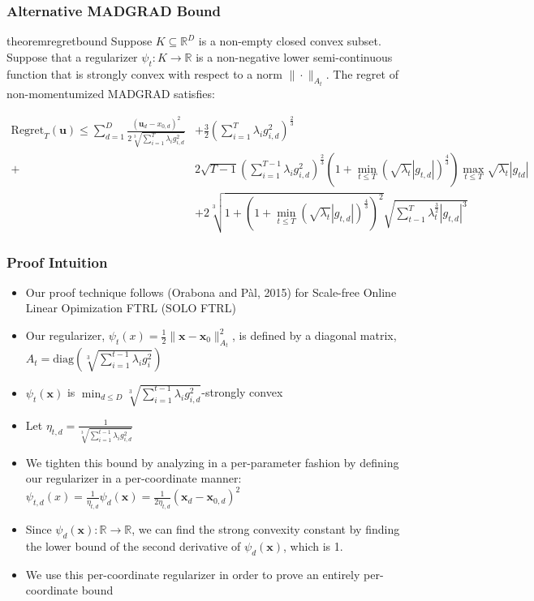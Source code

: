 \documentclass{beamer}
\newcommand{\R}{\mathbb{R}}
\newcommand{\Regret}{\text{Regret}}
\newcommand{\diag}{\text{diag}}
\newcommand{\bx}{\mathbf{x}}
\newcommand{\bu}{\mathbf{u}}
\begin{document}
\begin{frame}[shrink=20]
  \frametitle{Alternative MADGRAD Bound}
  \begin{restatable}{theorem}{regretbound}\label{theorem:1}
    Suppose $K \subseteq \R^D$ is a non-empty closed convex subset. Suppose that a regularizer $\psi_t: K \rightarrow \R$
    is a non-negative lower semi-continuous function that is strongly convex with respect to a norm $\| \cdot
    \|_{A_t}$. The regret of non-momentumized MADGRAD satisfies:

    \begin{align*}
      \Regret_T(\bu) \leq \sum\limits_{d=1}^D \frac{(\bu_d - x_{0,d})^2}{2\sqrt[3]{\sum\limits_{i=1}^{T} \lambda_i
        g_{i,d}^2}} &+ \frac{3}{2}\left(\sum\limits_{i=1}^T \lambda_i g_{i,d}^2\right)^\frac{2}{3} \\ +& 2
          \sqrt{T-1}\left(\sum_{i=1}^{T-1} \lambda_i g_{i,d}^2\right)^\frac{2}{3}(1 + \min_{t \leq
          T}(\sqrt{\lambda_t}|g_{t,d}|)^\frac{4}{3}) \max_{t \leq T} \sqrt{\lambda_t}|g_{td}| \\ &+ 2\sqrt[3]{1 + (1 +
          \min_{t \leq T}(\sqrt{\lambda_t}|g_{t,d}|)^\frac{4}{3})^2}\sqrt{\sum\limits_{t-1}^T \lambda_t^\frac{3}{2}
        |g_{t,d}|^3}
    \end{align*}
  \end{restatable}
\end{frame}

\begin{frame}[shrink=20]
  \frametitle{Proof Intuition}
  \begin{itemize}
    \item Our proof technique follows (Orabona and P\`al, 2015) for Scale-free Online Linear Opimization FTRL (SOLO FTRL)
    \item Our regularizer, $\psi_t(x) = \frac{1}{2}\|\bx - \bx_0\|_{A_t}^2$, is defined by a diagonal matrix, $A_t =
      \diag\left(\sqrt[3]{\sum\limits_{i=1}^{t-1} \lambda_i g_{i}^2}\right)$
    \item $\psi_t(\bx)$ is $\min_{d \leq D} \sqrt[3]{\sum\limits_{i=1}^{t-1} \lambda_i g_{i,d}^2}$-strongly convex
    \item Let $\eta_{t,d} = \frac{1}{\sqrt[3]{\sum_{i=1}^{t-1}\lambda_i g_{i,d}^2}}$
    \item We tighten this bound by analyzing in a per-parameter fashion by defining our regularizer in a per-coordinate
      manner: $\psi_{t,d}(x) = \frac{1}{\eta_{t,d}} \psi_{d}(\bx) = \frac{1}{2\eta_{t,d}}(\bx_d - \bx_{0,d})^2$
    \item Since $\psi_d(\bx): \R \rightarrow \R$, we can find the strong convexity constant by finding the lower bound
      of the second derivative of $\psi_d(\bx)$, which is 1.
    \item We use this per-coordinate regularizer in order to prove an entirely per-coordinate bound
  \end{itemize}
\end{frame}
\end{document}
